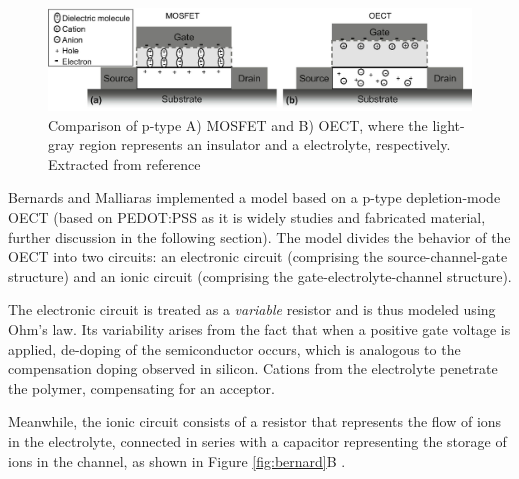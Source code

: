 \begin{figure}[h]
  \centering
  \includegraphics[width=\textwidth]{Images/pdf/MOSFETvsOECTs.pdf}
  \caption[Device physics of MOSFET vs OECT]{Comparison of p-type A) MOSFET and B) OECT, where the light-gray region represents an insulator and a electrolyte, respectively. Extracted from reference  \cite{friedleinDevicePhysicsOrganic2018}}
  \label{fig:vsMOS}
\end{figure}

Bernards and Malliaras implemented a model based on a p-type depletion-mode OECT (based on PEDOT:PSS as it is widely studies and fabricated material, further discussion in the following section). The model divides the behavior of the OECT into two circuits: an electronic circuit (comprising the source-channel-gate structure) and an ionic circuit (comprising the gate-electrolyte-channel structure).

The electronic circuit is treated as a \textit{variable} resistor and is thus modeled using Ohm's law. Its variability arises from the fact that when a positive gate voltage is applied, de-doping of the semiconductor occurs, which is analogous to the compensation doping observed in silicon. Cations from the electrolyte penetrate the polymer, compensating for an acceptor. 

Meanwhile, the ionic circuit consists of a resistor that represents the flow of ions in the electrolyte, connected in series with a capacitor representing the storage of ions in the channel, as shown in Figure \ref{fig:bernard}B  \cite{rivnayOrganicElectrochemicalTransistors2018}\cite{bernardsSteadyStateTransientBehavior2007}. 

